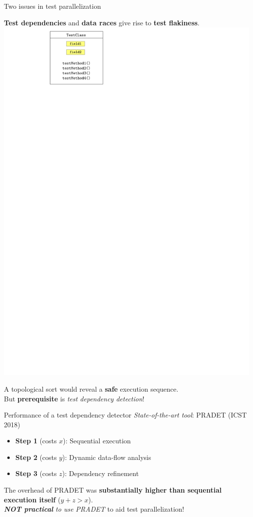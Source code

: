 \documentclass{beamer}
\begin{document}
\begin{frame}{Two issues in test parallelization}
	\begin{center}
		{\color{blue}\textbf{Test dependencies} {\color{black}and} \textbf{data races}} give rise to {\color{red}\textbf{test flakiness}}.
		\includegraphics[width=0.8\linewidth,page=7]{images/flakes.pdf}
	\end{center}
\centering
A {\rsm topological sort} would reveal a {\color{indiagreen}\textbf{safe}} execution sequence.\\\pause
But {\color{darkred}\textbf{prerequisite}} is \textit{test dependency detection}!
\end{frame}

\begin{frame}{Performance of a test dependency detector}
	\textit{State-of-the-art tool}: PRADET (ICST 2018)
	\vfill
	\begin{itemize}
		\fontsize{11}{11}\selectfont
		\item[]{{\textbf{Step 1} (costs $x$)}: {\rsm Sequential execution}}\pause
		\item[]{{\textbf{Step 2} (costs $y$)}: {\rsm Dynamic data-flow analysis}}\pause
		\item[]{{\textbf{Step 3} (costs $z$)}: {\rsm Dependency refinement}}\pause
	\end{itemize}
	\begin{center}
		\begin{tcolorbox}
			The overhead of {\rsm PRADET} was {\color{red} \textbf{substantially higher than sequential execution itself}} ($y+z>{x}$).\\\textit{\textbf{NOT practical} to use PRADET} to aid test parallelization!
		\end{tcolorbox}
	\end{center}
\end{frame}
\end{document}

